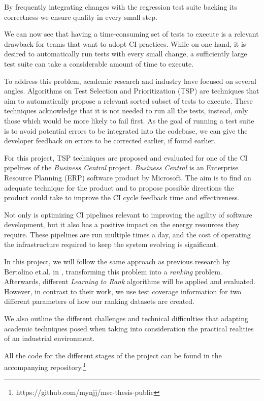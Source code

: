 By frequently integrating changes with the regression test suite backing its correctness
we ensure quality in every small step.

We can now see that having a time-consuming set of tests to execute is a relevant 
drawback for teams that want to adopt CI practices. While on one hand, it is desired
to automatically run tests with every small change, a sufficiently large test suite
can take a considerable amount of time to execute.

To address this problem, academic research and industry have focused on several angles.
Algorithms on Test Selection and Prioritization (TSP) are techniques that aim to 
automatically propose a relevant sorted subset of tests to execute. These techniques
acknowledge that it is not needed to run all the tests, instead, only
those which would be more likely to fail first. As the goal of running a test suite is to
avoid potential errors to be integrated into the codebase, we can give the developer 
feedback on errors to be corrected earlier, if found earlier.

For this project, TSP techniques are proposed and evaluated for one of the CI pipelines
of the \emph{Business Central} project. \emph{Business Central} is an Enterprise Resource Planning (ERP)
software product by Microsoft. The aim is to find an adequate technique
for the product and to propose possible directions the product could take to improve the
CI cycle feedback time and effectiveness.

Not only is optimizing CI pipelines relevant to improving the agility of software development, 
but it also has a positive impact on the energy resources they require.
These pipelines are run multiple times a day, and the cost of operating the infrastructure
required to keep the system evolving is significant.

In this project, we will follow the same approach as previous research by Bertolino
et.al. in \cite{Bertolino2020LearningtoRankVR}, transforming this problem into a \emph{ranking} problem.
Afterwards, different \emph{Learning to Rank} algorithms will be applied and evaluated.
However, in contrast to their work, we use test coverage information for two different 
parameters of how our ranking datasets are created.

We also outline the different challenges and technical difficulties that adapting
academic techniques posed when taking into consideration the practical realities
of an industrial environment. 

All the code for the different stages of the project can be found 
in the accompanying repository.\footnote{https://github.com/mynjj/msc-thesis-public}